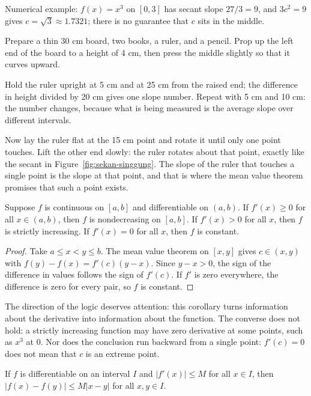 Numerical example: $f(x)=x^{3}$ on $[0,3]$ has secant slope $27/3=9$, and $3c^{2}=9$ gives
$c=\sqrt{3}\approx1.7321$; there is no guarantee that $c$ sits in the middle.

\begin{tangan}
Prepare a thin 30 cm board, two books, a ruler, and a pencil. Prop up the left end of the
board to a height of 4 cm, then press the middle slightly so that it curves upward.

Hold the ruler upright at 5 cm and at 25 cm from the raised end; the difference in height
divided by 20 cm gives one slope number. Repeat with 5 cm and 10 cm: the number changes,
because what is being measured is the average slope over different intervals.

Now lay the ruler flat at the 15 cm point and rotate it until only one point touches. Lift the
other end slowly: the ruler rotates about that point, exactly like the secant in
Figure~\ref{fig:sekan-singgung}. The slope of the ruler that touches a single point is the
slope at that point, and that is where the mean value theorem promises that such a point
exists.
\end{tangan}

\begin{akibat}
Suppose $f$ is continuous on $[a,b]$ and differentiable on $(a,b)$. If $f'(x)\ge0$ for all
$x\in(a,b)$, then $f$ is nondecreasing on $[a,b]$. If $f'(x)>0$ for all $x$, then $f$ is
strictly increasing. If $f'(x)=0$ for all $x$, then $f$ is constant.
\end{akibat}

\begin{proof}
Take $a\le x<y\le b$. The mean value theorem on $[x,y]$ gives $c\in(x,y)$ with
$f(y)-f(x)=f'(c)(y-x)$. Since $y-x>0$, the sign of the difference in values follows the sign
of $f'(c)$. If $f'$ is zero everywhere, the difference is zero for every pair, so $f$ is
constant.
\end{proof}

The direction of the logic deserves attention: this corollary turns information about the
derivative into information about the function. The converse does not hold: a strictly
increasing function may have zero derivative at some points, such as $x^{3}$ at $0$. Nor does
the conclusion run backward from a single point: $f'(c)=0$ does not mean that $c$ is an
extreme point.

\begin{akibat}
If $f$ is differentiable on an interval $I$ and $|f'(x)|\le M$ for all $x\in I$, then
$|f(x)-f(y)|\le M|x-y|$ for all $x,y\in I$.
\end{akibat}

